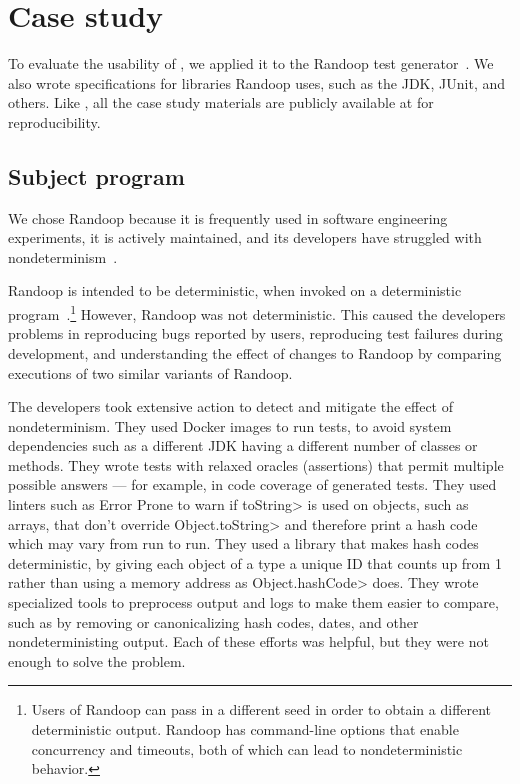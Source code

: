 \section{Case study}\label{sec:randoop-case-study}

To evaluate the usability of \theDeterminismChecker,
we applied it to the Randoop test
generator~\ifanonymous{}\else\cite{PachecoLEB2007}\fi.
We also wrote specifications for libraries Randoop uses, such as the JDK, JUnit,
and others.
Like \theDeterminismCheckerImplementation,
all the case study materials are publicly available at  for reproducibility. 


\subsection{Subject program}\label{sec:subject-program}

We chose Randoop because 
it is frequently used in software engineering experiments,
it is actively maintained,
and its developers have struggled with nondeterminism~\cite{randoop-issue-tracker,randoop-mailing-lists}.

Randoop is intended to be deterministic, when invoked on a deterministic
program~\cite{randoop-manual}.\footnote{Users of Randoop can pass in a different seed in order to
  obtain a different deterministic output.  Randoop has command-line
  options that enable concurrency and timeouts, both of which can lead to
  nondeterministic behavior.}
However, Randoop was not deterministic.  This caused the developers
problems in 
reproducing bugs reported by users, 
reproducing test failures during development, and
understanding the effect of changes to Randoop by comparing executions of two
similar variants of Randoop.

The developers took extensive action to detect and mitigate the effect of nondeterminism.
They used Docker images to run tests, to avoid system dependencies such as
a different JDK having a different number of classes or methods.
They wrote tests with relaxed oracles (assertions) that permit multiple
possible answers --- for example, in code coverage of generated tests.
They used linters such as Error Prone to warn if \<toString> is used on
objects, such as arrays, that don't override \<Object.toString> and therefore print a
hash code which may vary from run to run.
They used a library that makes hash codes deterministic, by giving each
object of a type a unique ID that counts up from 1 rather than using a
memory address as \<Object.hashCode> does.
They wrote specialized tools to preprocess output and logs to make them easier
to compare, such as by removing or canonicalizing hash codes, dates, and
other nondeterministing output.
Each of these efforts was helpful, but they were not enough to solve the problem.

